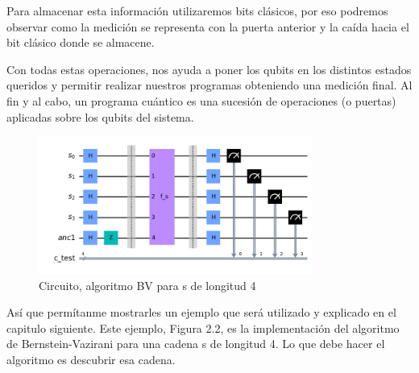  Para almacenar esta información utilizaremos bits clásicos, por eso podremos observar como la medición se representa con la puerta anterior y la caída hacia el bit clásico donde se almacene. \newline
 
 Con todas estas operaciones, nos ayuda a poner los qubits en los distintos estados queridos y permitir realizar nuestros programas obteniendo una medición final. Al fin y al cabo, un programa cuántico es una sucesión de operaciones (o puertas) aplicadas sobre los qubits del sistema.

 \begin{figure}[H]
    \centering
    \includegraphics[width=0.8\textwidth]{TFG/imagenes/BV_circuito.png}
    \caption{Circuito, algoritmo BV para s de longitud 4} 
 \end{figure}

  Así que permítanme mostrarles un ejemplo que será utilizado y explicado en el capitulo siguiente. Este ejemplo, Figura 2.2, es la implementación del algoritmo de Bernstein-Vazirani para una cadena s de longitud 4. Lo que debe hacer el algoritmo es descubrir esa cadena.\newline

